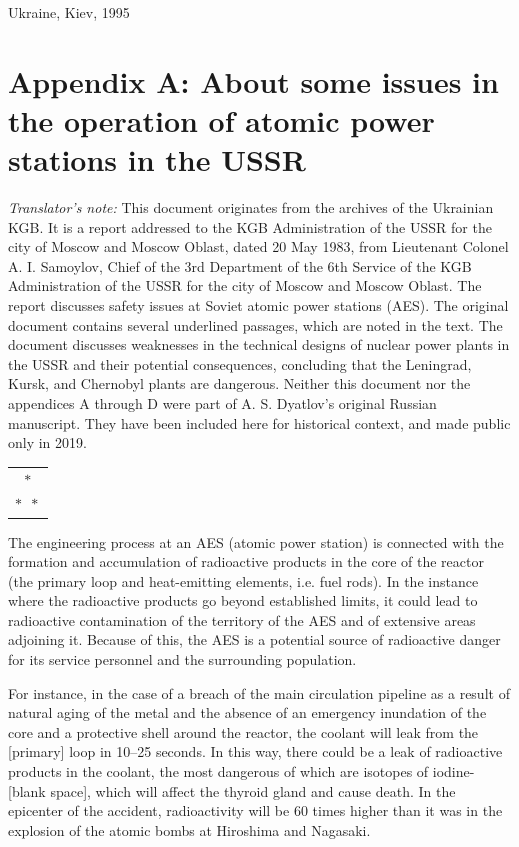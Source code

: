 \documentclass[openright]{bookest}
\newcommand{\varthreestars}{\begin{center}\begin{tabular}{c}$\ast$\\[-0.8ex] $\ast\enspace \ast $\end{tabular}\end{center}}
\begin{document}
Ukraine, Kiev, 1995

\chapter*{Appendix A: About some issues in the operation of atomic power stations in the USSR}

\textit{Translator's note:} This document originates from the archives of the Ukrainian KGB. It is a report addressed to the KGB Administration of the USSR for the city of Moscow and Moscow Oblast, dated 20 May 1983, from Lieutenant Colonel A. I. Samoylov, Chief of the 3rd Department of the 6th Service of the KGB Administration of the USSR for the city of Moscow and Moscow Oblast. The report discusses safety issues at Soviet atomic power stations (AES). The original document contains several underlined passages, which are noted in the text. The document discusses weaknesses in the technical designs of nuclear power plants in the USSR and their potential consequences, concluding that the Leningrad, Kursk, and Chernobyl plants are dangerous. Neither this document nor the appendices A through D were part of A. S. Dyatlov's original Russian manuscript. They have been included here for historical context, and made public only in 2019.

\varthreestars

The engineering process at an AES (atomic power station) is connected with the formation and accumulation of radioactive products in the core of the reactor (the primary loop and heat-emitting elements, i.e. fuel rods). In the instance where the radioactive products go beyond established limits, it could lead to radioactive contamination of the territory of the AES and of extensive areas adjoining it. Because of this, the AES is a potential source of radioactive danger for its service personnel and the surrounding population.

For instance, in the case of a breach of the main circulation pipeline as a result of natural aging of the metal and the absence of an emergency inundation of the core and a protective shell around the reactor, the coolant will leak from the [primary] loop in \numrange{10}{25} seconds. In this way, there could be a leak of radioactive products in the coolant, the most dangerous of which are isotopes of iodine- [blank space], which will affect the thyroid gland and cause death. In the epicenter of the accident, radioactivity will be \num{60} times higher than it was in the explosion of the atomic bombs at Hiroshima and Nagasaki.
\end{document}
